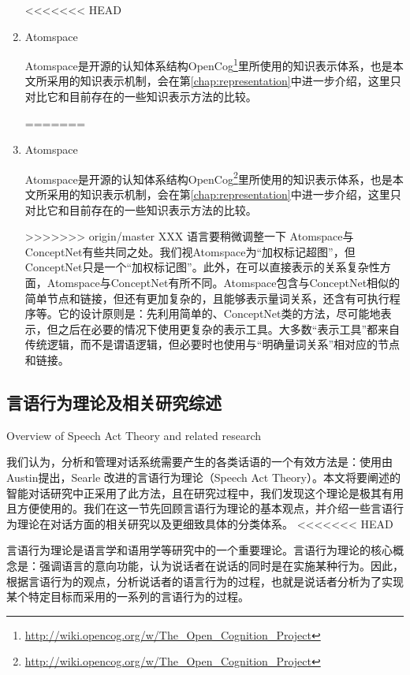 \begin{enumerate}
\begin{description}
\end{description}
<<<<<<< HEAD

\item{Atomspace}

Atomspace是开源的认知体系结构OpenCog\footnote{\url{http://wiki.opencog.org/w/The_Open_Cognition_Project}}里所使用的知识表示体系，也是本文所采用的知识表示机制，会在第\ref{chap:representation}中进一步介绍，这里只对比它和目前存在的一些知识表示方法的比较。

=======

\item{Atomspace}

Atomspace是开源的认知体系结构OpenCog\footnote{\url{http://wiki.opencog.org/w/The_Open_Cognition_Project}}里所使用的知识表示体系，也是本文所采用的知识表示机制，会在第\ref{chap:representation}中进一步介绍，这里只对比它和目前存在的一些知识表示方法的比较。

>>>>>>> origin/master
XXX 语言要稍微调整一下
Atomspace与ConceptNet有些共同之处。我们视Atomspace为“加权标记超图”，但ConceptNet只是一个“加权标记图”。此外，在可以直接表示的关系复杂性方面，Atomspace与ConceptNet有所不同。Atomspace包含与ConceptNet相似的简单节点和链接，但还有更加复杂的，且能够表示量词关系，还含有可执行程序等。它的设计原则是：先利用简单的、ConceptNet类的方法，尽可能地表示，但之后在必要的情况下使用更复杂的表示工具。大多数“表示工具”都来自传统逻辑，而不是谓语逻辑，但必要时也使用与“明确量词关系”相对应的节点和链接。

\end{enumerate}

\subsection{言语行为理论及相关研究综述}{Overview of Speech Act Theory and related research}
\label{sec:speechAct}

我们认为，分析和管理对话系统需要产生的各类话语的一个有效方法是：使用由Austin\cite{Austin2005}提出，Searle\cite{Searle1969} 改进的言语行为理论（Speech Act Theory）。本文将要阐述的智能对话研究中正采用了此方法，且在研究过程中，我们发现这个理论是极其有用且方便使用的。我们在这一节先回顾言语行为理论的基本观点，并介绍一些言语行为理论在对话方面的相关研究以及更细致具体的分类体系。
<<<<<<< HEAD

言语行为理论是语言学和语用学等研究中的一个重要理论。言语行为理论的核心概念是：强调语言的意向功能，认为说话者在说话的同时是在实施某种行为。因此，根据言语行为的观点，分析说话者的语言行为的过程，也就是说话者分析为了实现某个特定目标而采用的一系列的言语行为的过程。

